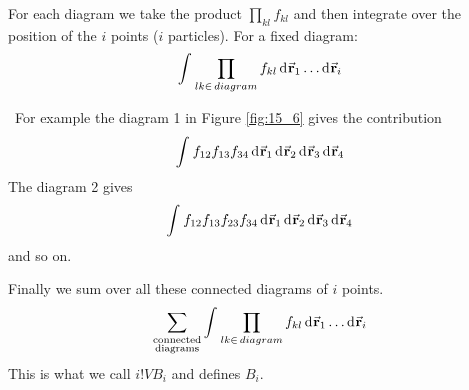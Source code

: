 \documentclass[../main/main.tex]{subfiles}
\begin{document}
For each diagram we take the product \( \prod_{kl}^{} f_{kl}   \) and then integrate over the position of the \( i \) points (\( i \) particles). For a fixed diagram:
\begin{equation}
  \int_{}^{} \prod_{lk \in \, diagram }^{} f_{kl} \dd[]{\va{r}_1} \dots \dd[]{\va{r}_i}
\end{equation}
\begin{example}[\( i=4 \)]\
  For example the diagram 1 in Figure \ref{fig:15_6} gives the contribution
  \begin{equation}
    \int_{}^{} f_{12} f_{13} f_{34} \dd[]{\va{r}_1}  \dd[]{\va{r}_2} \dd[]{\va{r}_3} \dd[]{\va{r}_4}
  \end{equation}
  The diagram 2 gives
  \begin{equation}
    \int_{}^{} f_{12} f_{13} f_{23} f_{34} \dd[]{\va{r}_1}  \dd[]{\va{r}_2} \dd[]{\va{r}_3} \dd[]{\va{r}_4}
  \end{equation}
  and so on.
\end{example}
Finally we sum over all these connected diagrams of \( i \) points.
\begin{equation}
  \sum_{\substack{ \text{connected} \\  \text{diagrams} } }^{}    \int_{}^{} \prod_{lk \in \, diagram }^{} f_{kl} \dd[]{\va{r}_1} \dots \dd[]{\va{r}_i}
\end{equation}
This is what we call \( i! V B_i \) and defines \( B_i \).
\end{document}
